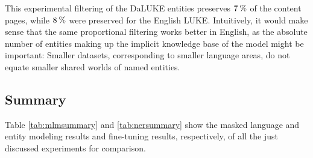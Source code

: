 \documentclass[main.tex]{subfiles}
\begin{document}
This experimental filtering of the DaLUKE entities preserves $7\:\text{\%{}}$ of the content pages, while $8\:\text{\%{}}$ were preserved for the English LUKE.
Intuitively, it would make sense that the same proportional filtering works better in English, as the absolute number of entities making up the implicit knowledge base of the model might be important:
Smaller datasets, corresponding to smaller language areas, do not equate smaller shared worlds of named entities.

\subsection{Summary} \label{subsec:preoverview}
Table \ref{tab:mlmsummary} and \ref{tab:nersummary} show the masked language and entity modeling results and fine-tuning results, respectively, of all the just discussed experiments for comparison.
\end{document}
